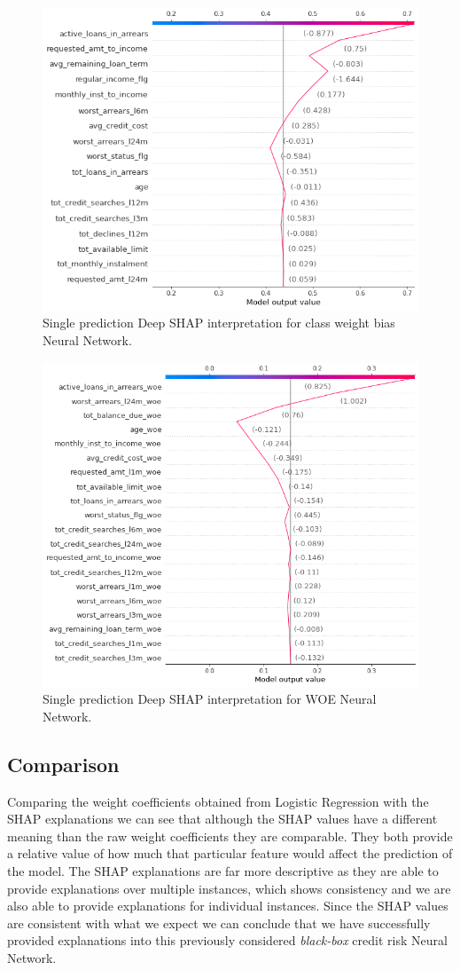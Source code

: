 \begin  {figure}[!htpb]
\centering
  \includegraphics[width=0.8\linewidth]{Credit_Images/shap-nn-weighted-single.png}
   \caption{Single prediction Deep SHAP interpretation for class weight bias Neural Network.}
    \label{fig-deep-shap-weighted-single-NN}
\end{figure}

\begin  {figure}[!htpb]
\centering
  \includegraphics[width=0.8\linewidth]{Credit_Images/WOE_IV_NOSCALE_INDV.png}
   \caption{Single prediction Deep SHAP interpretation for WOE Neural Network.}
    \label{fig-deep-shap-WOE-single-NN}
\end{figure}


\subsection{Comparison} Comparing the weight coefficients obtained from Logistic Regression with the SHAP explanations we can see that although the SHAP values have a different meaning than the raw weight coefficients they are comparable. They both provide a relative value of how much that particular feature would affect the prediction of the model. The SHAP explanations are far more descriptive as they are able to provide explanations over multiple instances, which shows consistency and we are also able to provide explanations for individual instances. Since the SHAP values are consistent with what we expect we can conclude that we have successfully provided explanations into this previously considered \emph{black-box} credit risk Neural Network.

